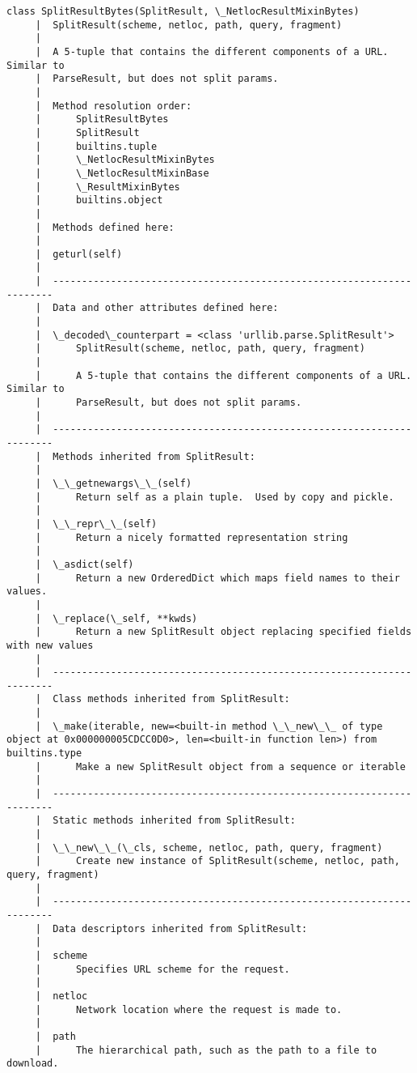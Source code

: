 \documentclass[11pt]{article}
\begin{document}
\begin{Verbatim}[commandchars=\\\{\}]
    class SplitResultBytes(SplitResult, \_NetlocResultMixinBytes)
     |  SplitResult(scheme, netloc, path, query, fragment)
     |  
     |  A 5-tuple that contains the different components of a URL. Similar to
     |  ParseResult, but does not split params.
     |  
     |  Method resolution order:
     |      SplitResultBytes
     |      SplitResult
     |      builtins.tuple
     |      \_NetlocResultMixinBytes
     |      \_NetlocResultMixinBase
     |      \_ResultMixinBytes
     |      builtins.object
     |  
     |  Methods defined here:
     |  
     |  geturl(self)
     |  
     |  ----------------------------------------------------------------------
     |  Data and other attributes defined here:
     |  
     |  \_decoded\_counterpart = <class 'urllib.parse.SplitResult'>
     |      SplitResult(scheme, netloc, path, query, fragment)
     |      
     |      A 5-tuple that contains the different components of a URL. Similar to
     |      ParseResult, but does not split params.
     |  
     |  ----------------------------------------------------------------------
     |  Methods inherited from SplitResult:
     |  
     |  \_\_getnewargs\_\_(self)
     |      Return self as a plain tuple.  Used by copy and pickle.
     |  
     |  \_\_repr\_\_(self)
     |      Return a nicely formatted representation string
     |  
     |  \_asdict(self)
     |      Return a new OrderedDict which maps field names to their values.
     |  
     |  \_replace(\_self, **kwds)
     |      Return a new SplitResult object replacing specified fields with new values
     |  
     |  ----------------------------------------------------------------------
     |  Class methods inherited from SplitResult:
     |  
     |  \_make(iterable, new=<built-in method \_\_new\_\_ of type object at 0x000000005CDCC0D0>, len=<built-in function len>) from builtins.type
     |      Make a new SplitResult object from a sequence or iterable
     |  
     |  ----------------------------------------------------------------------
     |  Static methods inherited from SplitResult:
     |  
     |  \_\_new\_\_(\_cls, scheme, netloc, path, query, fragment)
     |      Create new instance of SplitResult(scheme, netloc, path, query, fragment)
     |  
     |  ----------------------------------------------------------------------
     |  Data descriptors inherited from SplitResult:
     |  
     |  scheme
     |      Specifies URL scheme for the request.
     |  
     |  netloc
     |      Network location where the request is made to.
     |  
     |  path
     |      The hierarchical path, such as the path to a file to download.

\end{Verbatim}
\end{document}

